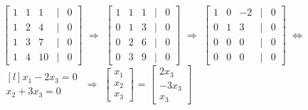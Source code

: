 \begin{tbox}
        \hspace{0.5cm}
        \scriptsize
        $\begin{bmatrix}
            1 & 1 & 1 & | & 0 \\
            1 & 2 & 4 & | & 0 \\
            1 & 3 & 7 & | & 0 \\
            1 & 4 & 10 & | & 0
        \end{bmatrix}$
        $\Rightarrow$
        $\begin{bmatrix}
            1 & 1 & 1 & | & 0 \\
            0 & 1 & 3 & | & 0 \\
            0 & 2 & 6 & | & 0 \\
            0 & 3 & 9 & | & 0
        \end{bmatrix}$
        $\Rightarrow$
        $\begin{bmatrix}
            1 & 0 & -2 & | & 0 \\
            0 & 1 & 3 & | & 0 \\
            0 & 0 & 0 & | & 0 \\
            0 & 0 & 0 & | & 0
        \end{bmatrix}$
        $\Leftrightarrow$
        $\begin{matrix*}[l]
            x_1 - 2x_3 = 0 \\
            x_2 + 3x_3 = 0
        \end{matrix*}$
        $\Rightarrow$
        $\begin{bmatrix}
            x_1 \\
            x_2 \\
            x_3
        \end{bmatrix}$ =
        $\begin{bmatrix}
            2x_3 \\
            -3x_3 \\
            x_3
        \end{bmatrix}$
        \normalsize


\end{tbox}

